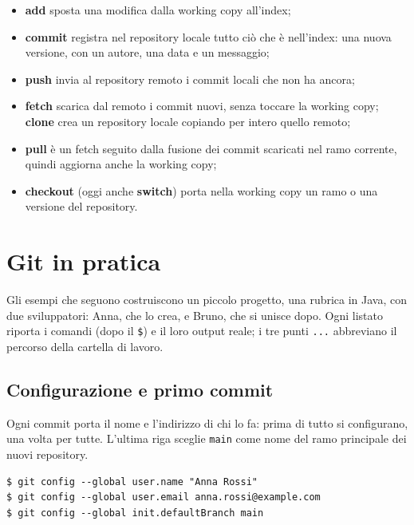 \begin{itemize}
  \item \textbf{add} sposta una modifica dalla working copy all'index;
  \item \textbf{commit} registra nel repository locale tutto ciò che è nell'index: una nuova versione, con un autore, una
        data e un messaggio;
  \item \textbf{push} invia al repository remoto i commit locali che non ha ancora;
  \item \textbf{fetch} scarica dal remoto i commit nuovi, senza toccare la working copy; \textbf{clone} crea un
        repository locale copiando per intero quello remoto;
  \item \textbf{pull} è un fetch seguito dalla fusione dei commit scaricati nel ramo corrente, quindi aggiorna anche la
        working copy;
  \item \textbf{checkout} (oggi anche \textbf{switch}) porta nella working copy un ramo o una versione del repository.
\end{itemize}

\section{Git in pratica}

Gli esempi che seguono costruiscono un piccolo progetto, una rubrica in Java, con due sviluppatori: Anna, che lo crea,
e Bruno, che si unisce dopo. Ogni listato riporta i comandi (dopo il \texttt{\$}) e il loro output reale; i tre punti
\texttt{...} abbreviano il percorso della cartella di lavoro.

\subsection{Configurazione e primo commit}

Ogni commit porta il nome e l'indirizzo di chi lo fa: prima di tutto si configurano, una volta per tutte. L'ultima
riga sceglie \texttt{main} come nome del ramo principale dei nuovi repository.

\begin{lstlisting}[style=shell, name=Terminale di Anna, deletekeywords={java}]
$ git config --global user.name "Anna Rossi"
$ git config --global user.email anna.rossi@example.com
$ git config --global init.defaultBranch main
\end{lstlisting}

